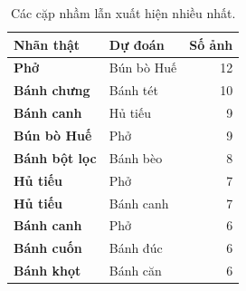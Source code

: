 \begin{table}[htbp]
\centering
\caption{Các cặp nhầm lẫn xuất hiện nhiều nhất.}
\label{tab:top-confusions}
\begin{tabular}{>{\bfseries}l l r}
\toprule Nhãn thật & Dự đoán & Số ảnh \\
\midrule
Phở & Bún bò Huế & 12 \\
Bánh chưng & Bánh tét & 10 \\
Bánh canh & Hủ tiếu & 9 \\
Bún bò Huế & Phở & 9 \\
Bánh bột lọc & Bánh bèo & 8 \\
Hủ tiếu & Phở & 7 \\
Hủ tiếu & Bánh canh & 7 \\
Bánh canh & Phở & 6 \\
Bánh cuốn & Bánh đúc & 6 \\
Bánh khọt & Bánh căn & 6 \\
\bottomrule
\end{tabular}
\end{table}
